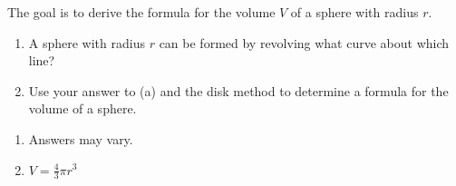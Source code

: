{The goal is to derive the formula for the volume $V$ of a sphere with radius $r$.
\begin{enumerate}
\item A sphere with radius $r$ can be formed by revolving what curve about which line?
\item Use your answer to (a) and the disk method to determine a formula for the volume of a sphere.
\end{enumerate}
}
{\begin{enumerate}
\item Answers may vary.
\item $V=\frac{4}{3}\pi r^3$
\end{enumerate}
}
